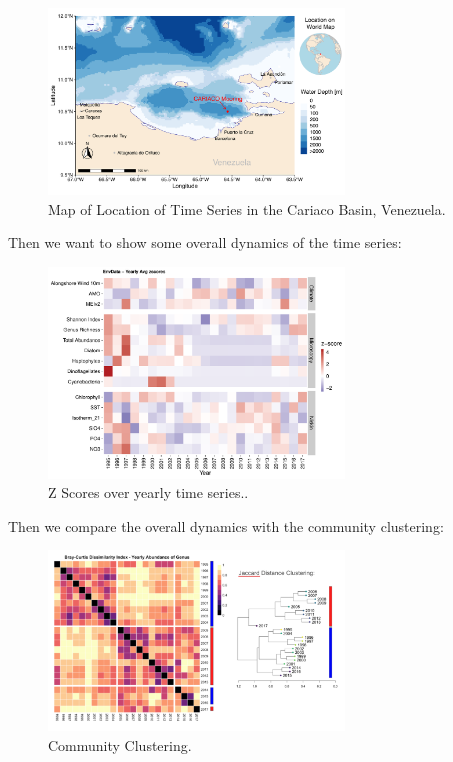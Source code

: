 \documentclass[a4paper]{article}
\begin{document}
        \begin{figure}[ht]
            \centering
            \includegraphics[width=0.7\textwidth]{fig/Artboard 1.pdf}
            \caption{Map of Location of Time Series in the Cariaco Basin, Venezuela.}
            \label{fig:example}
        \end{figure}
    
            Then we want to show some overall dynamics of the time series:
            
            \begin{figure}[ht]
            \centering
            \includegraphics[width=0.7\textwidth]{fig/PLOTZScores.pdf}
            \caption{Z Scores over yearly time series..}
            \label{fig:example}
        \end{figure}
    
             Then we compare the overall dynamics with the community clustering:
            
            \begin{figure}[ht]
            \centering
            \includegraphics[width=0.7\textwidth]{fig/Screenshot 2024-08-09 at 11.10.58.png}
            \caption{Community Clustering.}
            \label{fig:example}
        \end{figure}
    
\end{document}
